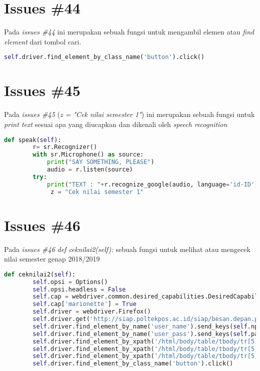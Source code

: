 \section{Issues \#44}
Pada \textit{issues \#44} ini merupakan sebuah fungsi untuk mengambil elemen atau \textit{find element} dari tombol cari.
\begin{lstlisting}[language=Python]
self.driver.find_element_by_class_name('button').click()
\end{lstlisting}

\section{Issues \#45}
Pada \textit{issues \#45} (\textit{z = "Cek nilai semester 1"}) ini merupakan sebuah fungsi untuk \textit{print text} sesuai apa yang diucapkan dan dikenali oleh \textit{speech recognition}
\begin{lstlisting}[language=Python]
def speak(self):
        r= sr.Recognizer()
        with sr.Microphone() as source:
            print("SAY SOMETHING, PLEASE")
            audio = r.listen(source)
        try:
            print("TEXT : "+r.recognize_google(audio, language='id-ID'))
             z = "Cek nilai semester 1"
\end{lstlisting}

\section{Issues \#46}
Pada \textit{issues \#46} \textit{def ceknilai2(self):
} sebuah fungsi untuk melihat atau mengecek nilai semester genap 2018/2019
\begin{lstlisting}[language=Python]
 def ceknilai2(self):
        self.opsi = Options()
        self.opsi.headless = False
        self.cap = webdriver.common.desired_capabilities.DesiredCapabilities().FIREFOX
        self.cap['marionette'] = True
        self.driver = webdriver.Firefox()
        self.driver.get('http://siap.poltekpos.ac.id/siap/besan.depan.php')
        self.driver.find_element_by_name('user_name').send_keys(self.npm)
        self.driver.find_element_by_name('user_pass').send_keys(self.paswd)
        self.driver.find_element_by_xpath('/html/body/table/tbody/tr[5]/td/table[1]/tbody/tr/td[2]/table[2]/tbody/tr[1]/td[2]/div/form/input[4]').click()
        self.driver.find_element_by_xpath('/html/body/table/tbody/tr[5]/td/table[1]/tbody/tr/td[1]/table[2]/tbody/tr[1]/td[2]/a[5]').click()
        self.driver.find_element_by_xpath('/html/body/table/tbody/tr[5]/td/table[3]/tbody/tr[1]/td[2]/p[1]/table/tbody/tr/td[3]/select/option[4]').click()
        self.driver.find_element_by_class_name('button').click()
\end{lstlisting}

